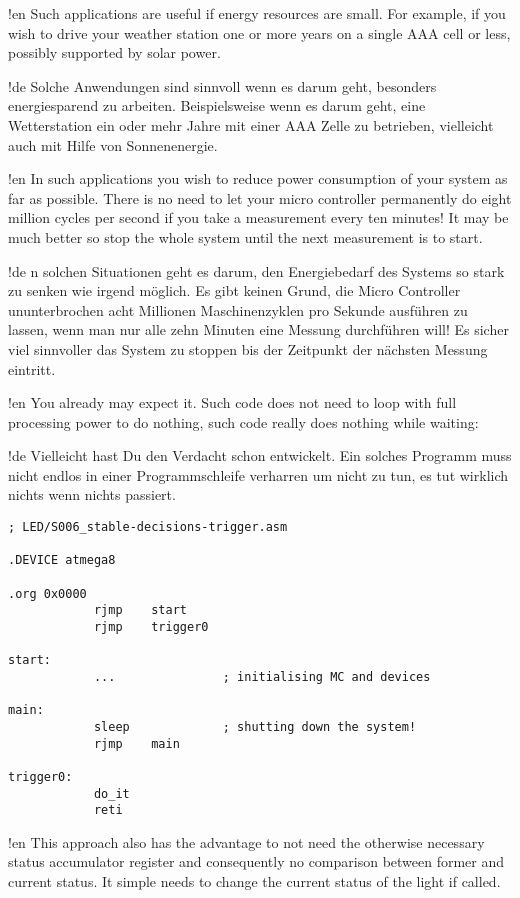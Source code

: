 !en Such applications are useful if energy resources are small. For example, if you wish to drive your weather station one or more years on a single AAA cell or less, possibly supported by solar power.

!de Solche Anwendungen sind sinnvoll wenn es darum geht, besonders energiesparend zu arbeiten. Beispielsweise wenn es darum geht, eine Wetterstation ein oder mehr Jahre mit einer AAA Zelle zu betrieben, vielleicht auch mit Hilfe von Sonnenenergie.



!en In such applications you wish to reduce power consumption of your system as far as possible. There is no need to let your micro controller permanently do eight million cycles per second if you take a measurement every ten minutes! It may be much better so stop the whole system until the next measurement is to start.


!de n solchen Situationen geht es darum, den Energiebedarf des Systems so stark zu senken wie irgend möglich. Es gibt keinen Grund, die Micro Controller ununterbrochen acht Millionen Maschinenzyklen pro Sekunde ausführen zu lassen, wenn man nur alle zehn Minuten eine Messung durchführen will! Es sicher viel sinnvoller das System zu stoppen bis der Zeitpunkt der nächsten Messung eintritt.



!en You already may expect it. Such code does not need to loop with full processing power to do nothing, such code really does nothing while waiting:

!de Vielleicht hast Du den Verdacht schon entwickelt. Ein solches Programm muss nicht endlos in einer Programmschleife verharren um nicht zu tun, es tut wirklich nichts wenn nichts passiert.



\begin{lstlisting}
; LED/S006_stable-decisions-trigger.asm

.DEVICE atmega8

.org 0x0000
            rjmp    start
            rjmp    trigger0
            
start:
            ...               ; initialising MC and devices
            
main:
            sleep             ; shutting down the system!
            rjmp    main

trigger0:
            do_it
            reti
\end{lstlisting}

!en This approach also has the advantage to not need the otherwise necessary status accumulator register and consequently no comparison between former and current status. It simple needs to change the current status of the light if called.

